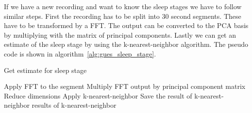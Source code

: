 If we have a new recording and want to know the sleep stages we have to follow similar steps. First the recording has to be split into 30 second segments. These have to be transformed by a FFT. The output can be converted to the PCA basis by multiplying with the matrix of principal components. Lastly we can get an estimate of the sleep stage by using the k-nearest-neighbor algorithm. The pseudo code is shown in algorithm~\ref{alg:gues_sleep_stage}.

\begin{algorithm}
	\caption{Get estimate for sleep stage}\label{alg:gues_sleep_stage}
	\begin{algorithmic}
			\State Apply FFT to the segment
			\State Multiply FFT output by principal component matrix
			\State Reduce dimensions
			\State Apply k-nearest-neighbor
			\State Save the result of k-nearest-neighbor
		\EndFor
		\State \Return results of k-nearest-neighbor
	\end{algorithmic}
\end{algorithm}
